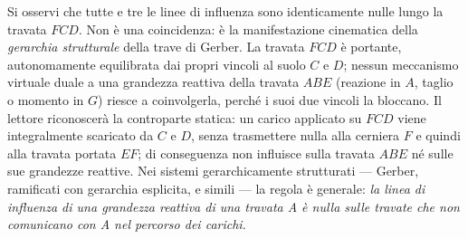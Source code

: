 \begin{esempio}
\begin{svolgimento}



		
	\end{svolgimento}
	
	\begin{oss}
		Si osservi che tutte e tre le linee di influenza sono
		identicamente nulle lungo la travata $FCD$. Non è una
		coincidenza: è la manifestazione cinematica della
		\emph{gerarchia strutturale} della trave di Gerber.
		La travata $FCD$ è portante, autonomamente
		equilibrata dai propri vincoli al suolo $C$ e $D$;
		nessun meccanismo virtuale duale a una grandezza
		reattiva della travata $ABE$ (reazione in $A$, taglio
		o momento in $G$) riesce a coinvolgerla, perché i suoi
		due vincoli la bloccano. Il lettore riconoscerà la
		controparte statica: un carico applicato su $FCD$
		viene integralmente scaricato da $C$ e $D$, senza
		trasmettere nulla alla cerniera $F$ e quindi alla
		travata portata $EF$; di conseguenza non influisce
		sulla travata $ABE$ né sulle sue grandezze reattive.
		Nei sistemi gerarchicamente strutturati --- Gerber,
		ramificati con gerarchia esplicita, e simili --- la
		regola è generale: \emph{la linea di influenza di una
			grandezza reattiva di una travata A è nulla sulle
			travate che non comunicano con A nel percorso dei
			carichi}.
	\end{oss}
	
\end{esempio}


